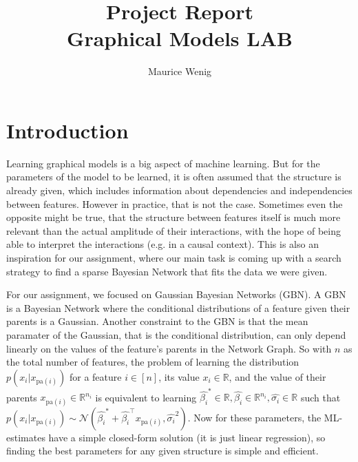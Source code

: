 \documentclass[sigconf, fleqn, prologue, dvipsnames]{acmart}
\def\R{\mathbb{R}}
\def\T{\top}
\def\pa{\text{pa}}
\begin{document}
\title[Project Report]{Project Report\\\large Graphical Models LAB}
\author{Maurice Wenig}

\maketitle


\section{Introduction}
Learning graphical models is a big aspect of machine learning.
But for the parameters of the model to be learned, it is often assumed that the structure is already given, which includes information about dependencies and independencies between features.
However in practice, that is not the case.
Sometimes even the opposite might be true, that the structure between features itself is much more relevant than the actual amplitude of their interactions, with the hope of being able to interpret the interactions (e.g. in a causal context).
This is also an inspiration for our assignment, where our main task is coming up with a search strategy to find a sparse Bayesian Network that fits the data we were given.

For our assignment, we focused on Gaussian Bayesian Networks (GBN).
A GBN is a Bayesian Network where the conditional distributions of a feature given their parents is a Gaussian.
Another constraint to the GBN is that the mean paramater of the Gaussian, that is the conditional distribution, can only depend linearly on the values of the feature's parents in the Network Graph.
So with $n$ as the total number of features, the problem of learning the distribution $p(x_i | x_{\pa(i)})$ for a feature $i \in [n]$, its value $x_i \in \R$, and the value of their parents $x_{\pa(i)} \in \R^{n_i}$ is equivalent to learning $\hat{\beta_i}^* \in \R, \hat{\beta_i} \in \R^{n_i}, \hat{\sigma_i} \in \R$ such that $p(x_i | x_{\pa(i)}) \sim \mathcal{N}(\hat{\beta_i}^* + \hat{\beta_i}^\T x_{\pa(i)}, \hat{\sigma_i}^2)$.
Now for these parameters, the ML-estimates have a simple closed-form solution (it is just linear regression), so finding the best parameters for any given structure is simple and efficient.
\end{document}
